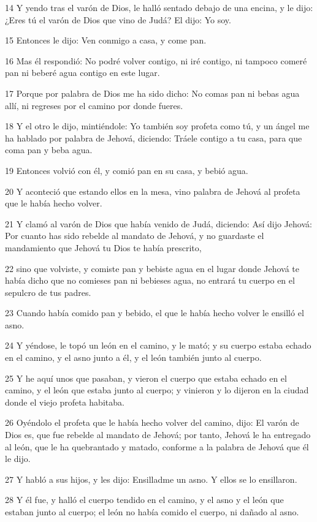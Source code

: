 \par 14 Y yendo tras el varón de Dios, le halló sentado debajo de una encina, y le dijo: ¿Eres tú el varón de Dios que vino de Judá? El dijo: Yo soy.
\par 15 Entonces le dijo: Ven conmigo a casa, y come pan.
\par 16 Mas él respondió: No podré volver contigo, ni iré contigo, ni tampoco comeré pan ni beberé agua contigo en este lugar.
\par 17 Porque por palabra de Dios me ha sido dicho: No comas pan ni bebas agua allí, ni regreses por el camino por donde fueres.
\par 18 Y el otro le dijo, mintiéndole: Yo también soy profeta como tú, y un ángel me ha hablado por palabra de Jehová, diciendo: Tráele contigo a tu casa, para que coma pan y beba agua.
\par 19 Entonces volvió con él, y comió pan en su casa, y bebió agua.
\par 20 Y aconteció que estando ellos en la mesa, vino palabra de Jehová al profeta que le había hecho volver.
\par 21 Y clamó al varón de Dios que había venido de Judá, diciendo: Así dijo Jehová: Por cuanto has sido rebelde al mandato de Jehová, y no guardaste el mandamiento que Jehová tu Dios te había prescrito,
\par 22 sino que volviste, y comiste pan y bebiste agua en el lugar donde Jehová te había dicho que no comieses pan ni bebieses agua, no entrará tu cuerpo en el sepulcro de tus padres.
\par 23 Cuando había comido pan y bebido, el que le había hecho volver le ensilló el asno.
\par 24 Y yéndose, le topó un león en el camino, y le mató; y su cuerpo estaba echado en el camino, y el asno junto a él, y el león también junto al cuerpo.
\par 25 Y he aquí unos que pasaban, y vieron el cuerpo que estaba echado en el camino, y el león que estaba junto al cuerpo; y vinieron y lo dijeron en la ciudad donde el viejo profeta habitaba.
\par 26 Oyéndolo el profeta que le había hecho volver del camino, dijo: El varón de Dios es, que fue rebelde al mandato de Jehová; por tanto, Jehová le ha entregado al león, que le ha quebrantado y matado, conforme a la palabra de Jehová que él le dijo.
\par 27 Y habló a sus hijos, y les dijo: Ensilladme un asno. Y ellos se lo ensillaron.
\par 28 Y él fue, y halló el cuerpo tendido en el camino, y el asno y el león que estaban junto al cuerpo; el león no había comido el cuerpo, ni dañado al asno.
